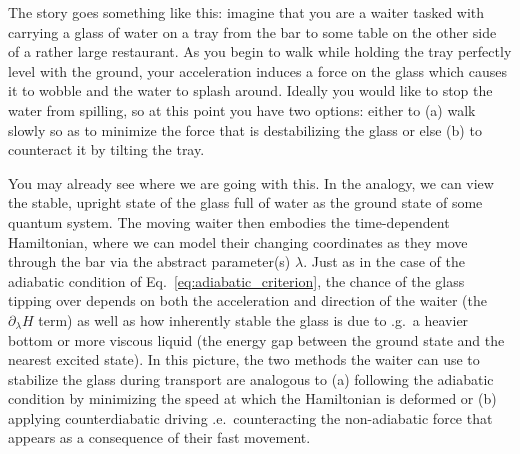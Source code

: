 \documentclass[a4paper,oneside,11pt]{book}
\newcommand{\dlambda}{\partial_{\lambda}}
\begin{document}
    The story goes something like this: imagine that you are a waiter tasked with carrying a glass of water on a tray from the bar to some table on the other side of a rather large restaurant. As you begin to walk while holding the tray perfectly level with the ground, your acceleration induces a force on the glass which causes it to wobble and the water to splash around. Ideally you would like to stop the water from spilling, so at this point you have two options: either to (a) walk slowly so as to minimize the force that is destabilizing the glass or else (b) to counteract it by tilting the tray. 

    You may already see where we are going with this. In the analogy, we can view the stable, upright state of the glass full of water as the ground state of some quantum system. The moving waiter then embodies the time-dependent Hamiltonian, where we can model their changing coordinates as they move through the bar via the abstract parameter(s) $\lambda$. Just as in the case of the adiabatic condition of Eq.~\eqref{eq:adiabatic_criterion}, the chance of the glass tipping over depends on both the acceleration and direction of the waiter (the $\dlambda H$ term) as well as how inherently stable the glass is due to \@e.g.~a heavier bottom or more viscous liquid (the energy gap between the ground state and the nearest excited state). In this picture, the two methods the waiter can use to stabilize the glass during transport are analogous to (a) following the adiabatic condition by minimizing the speed at which the Hamiltonian is deformed or (b) applying counterdiabatic driving \@i.e.~counteracting the non-adiabatic force that appears as a consequence of their fast movement.
\end{document}
